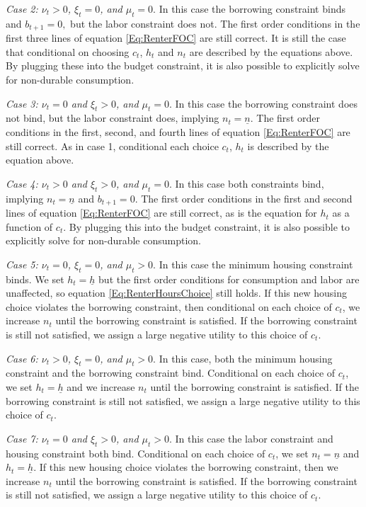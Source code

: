 \documentclass[letterpaper,12pt,dvipsnames,usenames]{article}
\theoremstyle{definition}
\begin{document}
\begin{spacing}{1.0}
\begin{small}
\emph{Case 2: $\nu_{t}>0$, $\xi_{t}=0$, and $\mu_{t}=0$}. In this case the borrowing constraint binds and $b_{t+1}=0,$ but the labor constraint does not. The first order conditions in the first three lines of equation \eqref{Eq:RenterFOC} are still correct. It is still the case that conditional on choosing $c_{t}$, $h_{t}$ and $n_{t}$ are described by the equations above. By plugging these into the budget constraint, it is also possible to explicitly solve for non-durable consumption.

\emph{Case 3: $\nu_{t}=0$ and $\xi_{t}>0$, and $\mu_{t}=0$}. In this case the borrowing constraint does not bind, but the labor constraint does, implying $n_{t}=\underline{n}$. The first order conditions in the first, second, and fourth lines of equation \eqref{Eq:RenterFOC} are still correct. As in case 1, conditional each choice $c_{t}$, $h_{t}$ is described by the equation above.

\emph{Case 4: $\nu_{t}>0$ and $\xi_{t}>0$, and $\mu_{t}=0$}. In this case both constraints bind, implying $n_{t}=\underline{n}$ and $b_{t+1}=0$. The first order conditions in the first and second lines of equation \eqref{Eq:RenterFOC} are still correct, as is the equation for $h_{t}$ as a function of $c_{t}$. By plugging this into the budget constraint, it is also possible to explicitly solve for non-durable consumption.

\emph{Case 5: $\nu_{t}=0$, $\xi_{t}=0$, and $\mu_{t}>0$}. In this case the minimum housing constraint binds. We set $h_{t}=\underline{h}$ but the first order conditions for consumption and labor are unaffected, so equation \eqref{Eq:RenterHoursChoice} still holds. If this new housing choice violates the borrowing constraint, then conditional on each choice of $c_{t}$, we increase $n_{t}$ until the borrowing constraint is satisfied. If the borrowing constraint is still not satisfied, we assign a large negative utility to this choice of $c_{t}$.

\emph{Case 6: $\nu_{t}>0$, $\xi_{t}=0$, and $\mu_{t}>0$}. In this case, both the minimum housing constraint and the borrowing constraint bind. Conditional on each choice of $c_{t}$, we set $h_{t}=\underline{h}$ and we increase $n_{t}$ until the borrowing constraint is satisfied. If the borrowing constraint is still not satisfied, we assign a large negative utility to this choice of $c_{t}$.

\emph{Case 7: $\nu_{t}=0$ and $\xi_{t}>0$, and $\mu_{t}>0$}. In this case the labor constraint and housing constraint both bind. Conditional on each choice of $c_{t}$, we set $n_{t}=\underline{n}$ and $h_{t}=\underline{h}$. If this new housing choice violates the borrowing constraint, then we increase $n_{t}$ until the borrowing constraint is satisfied. If the borrowing constraint is still not satisfied, we assign a large negative utility to this choice of $c_{t}$.


\end{small}
\end{spacing}
\end{document}
